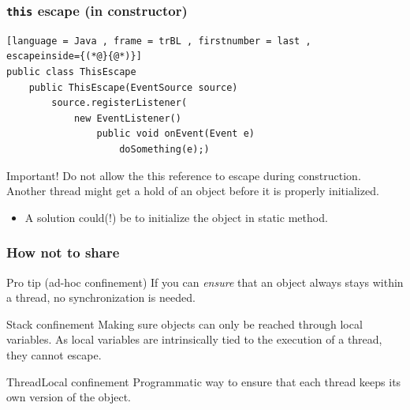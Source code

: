 \documentclass[xcolor={dvipsnames,svgnames},aspectratio=169]{beamer}
\begin{document}
\begin{frame}[fragile]
  \frametitle{\texttt{this} escape (in constructor)}

\begin{lstlisting}[language = Java , frame = trBL , firstnumber = last ,
escapeinside={(*@}{@*)}]
public class ThisEscape
    public ThisEscape(EventSource source)
        source.registerListener(
            new EventListener()
                public void onEvent(Event e)
                    doSomething(e);)
\end{lstlisting}

  \begin{block}{\texttt{\faBook} Important!}
    Do not allow the this reference to escape during construction. Another
    thread might get a hold of an object before it is properly initialized.
  \end{block}

  \begin{itemize}
  \item[\faBriefcaseMedical] A solution could(!) be to initialize the object in
    static method.
  \end{itemize}
\end{frame}

\begin{frame}[fragile]
  \frametitle{How not to share}

  \begin{block}{Pro tip (ad-hoc confinement)}
    If you can \emph{ensure} that an object always stays within a thread, no
    synchronization is needed.
  \end{block}
  \vspace{0.2cm}
  \begin{block}{Stack confinement}
    Making sure objects can only be reached through local variables. As local
    variables are intrinsically tied to the execution of a thread, they cannot escape.
  \end{block}
  \vspace{0.2cm}
  \begin{block}{ThreadLocal confinement}
    Programmatic way to ensure that each thread keeps its own version of the object.
  \end{block}
\end{frame}
\end{document}
